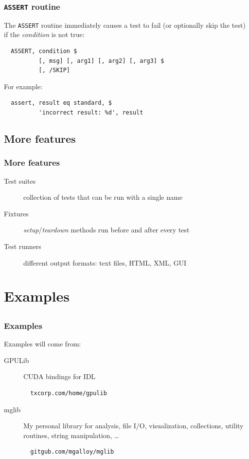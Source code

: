 \documentclass[12pt, handout]{beamer}
\begin{document}
\begin{frame}[t, fragile]
  \frametitle{{\tt ASSERT} routine}

The {\tt ASSERT} routine immediately causes a test to fail (or optionally skip the test) if the {\em condition} is not true:
\begin{lstlisting}
  ASSERT, condition $
          [, msg] [, arg1] [, arg2] [, arg3] $
          [, /SKIP]
\end{lstlisting}
For example:
\begin{lstlisting}
  assert, result eq standard, $
          'incorrect result: %d', result
\end{lstlisting}

\end{frame}

\subsection{More features}

\begin{frame}[t, fragile]
  \frametitle{More features}
  \begin{description}
    \item[Test suites] collection of tests that can be run with a single name
    \item[Fixtures] {\em setup}/{\em teardown} methods run before and after every test
    \item[Test runners] different output formats: text files, HTML, XML, GUI
  \end{description}
\end{frame}


\section{Examples}
\subsection*{}

\begin{frame}[t, fragile]
  \hypertarget{examples}{}
  \frametitle{Examples}
  Examples will come from:

  \begin{description}
    \item[GPULib] CUDA bindings for IDL
\begin{lstlisting}
  txcorp.com/home/gpulib
\end{lstlisting}
\hyperlink{gpulib}{}

    \item[mglib] My personal library for analysis, file I/O, visualization, collections, utility routines, string manipulation, \ldots
\begin{lstlisting}
  gitgub.com/mgalloy/mglib
\end{lstlisting}
  \end{description}
\end{frame}
\end{document}
